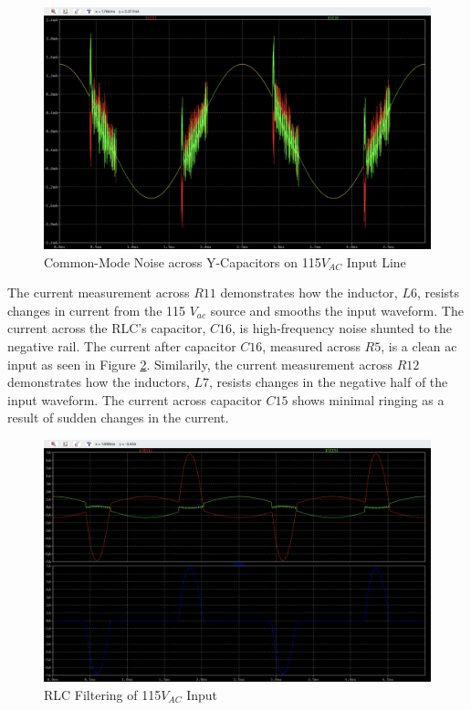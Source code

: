 \documentclass[conference]{IEEEtran}
\begin{document}
\begin{figure}[htp]
    \centering
    \includegraphics[width=1.0\linewidth]{ac_input_common_mode_y_cap_noise_waveform.png}
    \caption{Common-Mode Noise across Y-Capacitors on 115$V_{AC}$ Input Line}
    \label{fig:ac_input_common_mode_y_cap_noise_waveform}
\end{figure}

The current measurement across $R11$ demonstrates how the inductor, $L6$, resists changes in current from the 115 $V_{ac}$ source and smooths the input waveform. The current across the RLC's capacitor, $C16$, is high-frequency noise shunted to the negative rail. The current after capacitor $C16$, measured across $R5$, is a clean ac input as seen in Figure \ref{fig:ac_input_rlc_waveforms}. Similarily, the current measurement across $R12$ demonstrates how the inductors, $L7$, resists changes in the negative half of the input waveform. The current across capacitor $C15$ shows minimal ringing as a result of sudden changes in the current. 

\begin{figure}[htp]
    \centering
    \includegraphics[width=1.0\linewidth]{ac_input_rlc_waveforms.png}
    \caption{RLC Filtering of 115$V_{AC}$ Input}
    \label{fig:ac_input_rlc_waveforms}
\end{figure}
\end{document}
